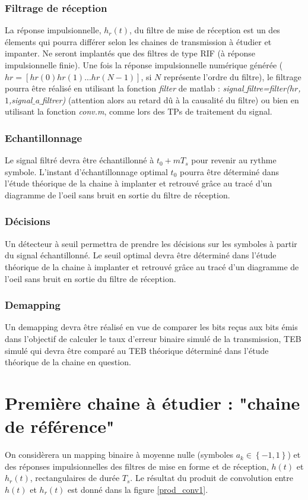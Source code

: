 \documentclass[frenchb]{article}
\begin{document}
\subsubsection{Filtrage de réception}
La réponse impulsionnelle, $h_r(t)$, du filtre de mise de réception est un des élements qui pourra différer selon les chaines de transmission à étudier et impanter. Ne seront implantés que des filtres de type RIF (à réponse impulsionnelle finie). Une fois la réponse impulsionnelle numérique générée ($hr=\left[hr(0) hr(1) ... hr(N-1)\right]$, si $N$ représente l'ordre du filtre), le filtrage pourra être réalisé en utilisant la fonction \emph{filter} de matlab : \emph{signal$\_$filtre=filter($hr$,$1$,signal$\_$a$\_$filtrer)} (attention alors au retard dû à la causalité du filtre) ou bien en utilisant la fonction \emph{conv.m}, comme lors des TPs de traitement du signal.

\subsubsection{Echantillonnage}
Le signal filtré devra être échantillonné à $t_0+mT_s$ pour revenir au rythme symbole. L'instant d'échantillonnage optimal $t_0$ pourra être déterminé dans l'étude théorique de la chaine à implanter et retrouvé grâce au tracé d'un diagramme de l'oeil sans bruit en sortie du filtre de réception.

\subsubsection{Décisions}
Un détecteur à seuil permettra de prendre les décisions sur les symboles à partir du signal échantillonné. Le seuil optimal devra être déterminé dans l'étude théorique de la chaine à implanter et retrouvé grâce au tracé d'un diagramme de l'oeil sans bruit en sortie du filtre de réception.

\subsubsection{Demapping} Un demapping devra être réalisé en vue de comparer les bits reçus aux bits émis dans l'objectif de calculer le taux d'erreur binaire simulé de la transmission, TEB simulé qui devra être comparé au TEB théorique déterminé dans l'étude théorique de la chaine en question.\\


\section{Première chaine à étudier : "chaine de référence"}
On considèrera un mapping binaire à moyenne nulle (symboles $a_k \in \left\{-1,1\right\}$) et des réponses impulsionnelles des filtres de mise en forme et de réception, $h(t)$ et $h_r(t)$, rectangulaires de durée $T_s$. Le résultat du produit de convolution entre $h(t)$ et $h_r(t)$ est donné dans la figure \ref{prod_conv1}.
\end{document}

